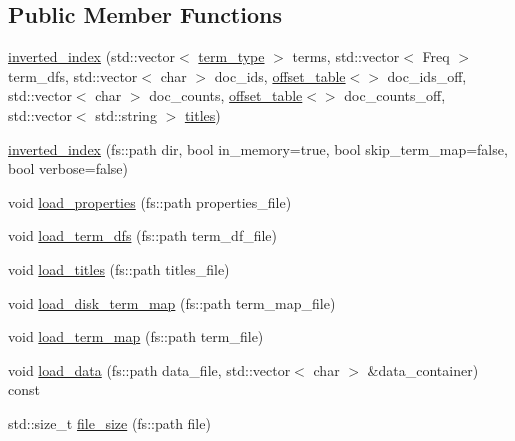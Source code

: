 \subsection*{Public Member Functions}
\begin{DoxyCompactItemize}
\item 
\mbox{\hyperlink{classirk_1_1inverted__index_aeac9d91ff26a573b8c6aa7f28918a5d7}{inverted\+\_\+index}} (std\+::vector$<$ \mbox{\hyperlink{classirk_1_1inverted__index_a7a60c2cec1774c08f21e8e27ccb5ac33}{term\+\_\+type}} $>$ terms, std\+::vector$<$ Freq $>$ term\+\_\+dfs, std\+::vector$<$ char $>$ doc\+\_\+ids, \mbox{\hyperlink{classirk_1_1offset__table}{offset\+\_\+table}}$<$$>$ doc\+\_\+ids\+\_\+off, std\+::vector$<$ char $>$ doc\+\_\+counts, \mbox{\hyperlink{classirk_1_1offset__table}{offset\+\_\+table}}$<$$>$ doc\+\_\+counts\+\_\+off, std\+::vector$<$ std\+::string $>$ \mbox{\hyperlink{classirk_1_1inverted__index_ac3c5100fced55578e115553c8cda9080}{titles}})
\item 
\mbox{\hyperlink{classirk_1_1inverted__index_a8b9969577ec0556c38ea05d5cc674fb8}{inverted\+\_\+index}} (fs\+::path dir, bool in\+\_\+memory=true, bool skip\+\_\+term\+\_\+map=false, bool verbose=false)
\item 
void \mbox{\hyperlink{classirk_1_1inverted__index_a592cccf4d8b77906e33e90b09f9dec7a}{load\+\_\+properties}} (fs\+::path properties\+\_\+file)
\item 
void \mbox{\hyperlink{classirk_1_1inverted__index_a3c9012991057b448f113bad80d344d68}{load\+\_\+term\+\_\+dfs}} (fs\+::path term\+\_\+df\+\_\+file)
\item 
void \mbox{\hyperlink{classirk_1_1inverted__index_a0b389492f9ab680e28f801590472069c}{load\+\_\+titles}} (fs\+::path titles\+\_\+file)
\item 
void \mbox{\hyperlink{classirk_1_1inverted__index_ad52c3a74f65778de12778dffb3306b62}{load\+\_\+disk\+\_\+term\+\_\+map}} (fs\+::path term\+\_\+map\+\_\+file)
\item 
void \mbox{\hyperlink{classirk_1_1inverted__index_af26ea157a030b67feff19878afbacbdd}{load\+\_\+term\+\_\+map}} (fs\+::path term\+\_\+file)
\item 
void \mbox{\hyperlink{classirk_1_1inverted__index_a231961e5ef231dabb4cd02becb64db5a}{load\+\_\+data}} (fs\+::path data\+\_\+file, std\+::vector$<$ char $>$ \&data\+\_\+container) const
\item 
std\+::size\+\_\+t \mbox{\hyperlink{classirk_1_1inverted__index_a06e5f0eb312766fe8ad96c054a9ec310}{file\+\_\+size}} (fs\+::path file)
\item 

\end{DoxyCompactItemize}
